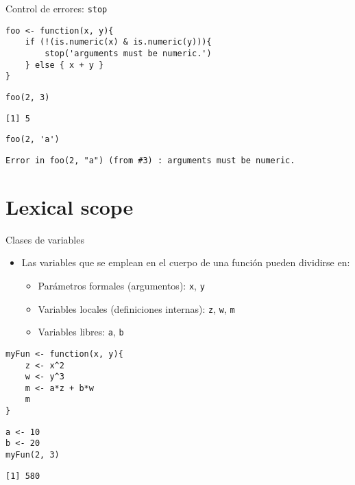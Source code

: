 \documentclass[xcolor={usenames,svgnames,dvipsnames}]{beamer}
\begin{document}
\begin{frame}[fragile,label={sec:orgheadline11}]{Control de errores: \texttt{stop}}
 \lstset{language=R,label= ,caption= ,captionpos=b,numbers=none}
\begin{lstlisting}
foo <- function(x, y){
    if (!(is.numeric(x) & is.numeric(y))){
        stop('arguments must be numeric.')
    } else { x + y }
}
\end{lstlisting}

\lstset{language=R,label= ,caption= ,captionpos=b,numbers=none}
\begin{lstlisting}
foo(2, 3)
\end{lstlisting}

\begin{verbatim}
[1] 5
\end{verbatim}

\lstset{language=R,label= ,caption= ,captionpos=b,numbers=none}
\begin{lstlisting}
foo(2, 'a')
\end{lstlisting}

\begin{verbatim}
Error in foo(2, "a") (from #3) : arguments must be numeric.
\end{verbatim}
\end{frame}

\section{Lexical scope}
\label{sec:orgheadline19}

\begin{frame}[fragile,label={sec:orgheadline13}]{Clases de variables}
 \begin{itemize}
\item Las variables que se emplean en el cuerpo de una función pueden
dividirse en:
\begin{itemize}
\item Parámetros formales (argumentos): \texttt{x}, \texttt{y}
\item Variables locales (definiciones internas): \texttt{z}, \texttt{w}, \texttt{m}
\item Variables libres: \texttt{a}, \texttt{b}
\end{itemize}
\end{itemize}
\lstset{language=R,label= ,caption= ,captionpos=b,numbers=none}
\begin{lstlisting}
myFun <- function(x, y){
    z <- x^2
    w <- y^3
    m <- a*z + b*w
    m
}
\end{lstlisting}

\lstset{language=R,label= ,caption= ,captionpos=b,numbers=none}
\begin{lstlisting}
a <- 10
b <- 20
myFun(2, 3)
\end{lstlisting}

\begin{verbatim}
[1] 580
\end{verbatim}
\end{frame}
\end{document}
